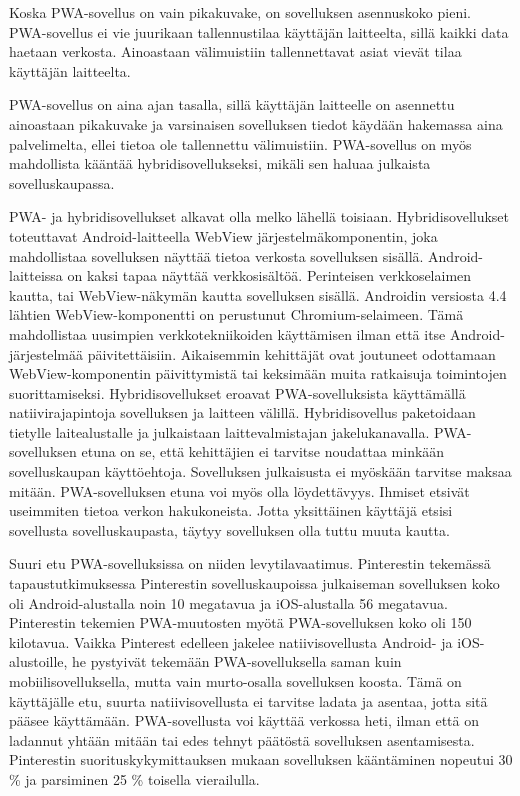 \documentclass{tktltiki}
\begin{document}
Koska PWA-sovellus on vain pikakuvake, on sovelluksen asennuskoko pieni. PWA-sovellus ei vie juurikaan tallennustilaa käyttäjän laitteelta, sillä kaikki data haetaan verkosta. Ainoastaan välimuistiin tallennettavat asiat vievät tilaa käyttäjän laitteelta.

PWA-sovellus on aina ajan tasalla, sillä käyttäjän laitteelle on asennettu ainoastaan pikakuvake ja varsinaisen sovelluksen tiedot käydään hakemassa aina palvelimelta, ellei tietoa ole tallennettu välimuistiin. PWA-sovellus on myös mahdollista kääntää hybridisovellukseksi, mikäli sen haluaa julkaista sovelluskaupassa. 

PWA- ja hybridisovellukset alkavat olla melko lähellä toisiaan. Hybridisovellukset toteuttavat Android-laitteella WebView järjestelmäkomponentin, joka mahdollistaa sovelluksen näyttää tietoa verkosta sovelluksen sisällä. Android-laitteissa on kaksi tapaa näyttää verkkosisältöä. Perinteisen verkkoselaimen kautta, tai WebView-näkymän kautta sovelluksen sisällä. Androidin versiosta 4.4 \cite{chromedeveloper} lähtien WebView-komponentti on perustunut Chromium-selaimeen. Tämä mahdollistaa uusimpien verkkotekniikoiden käyttämisen ilman että itse Android-järjestelmää päivitettäisiin. Aikaisemmin kehittäjät ovat joutuneet odottamaan WebView-komponentin päivittymistä tai keksimään muita ratkaisuja toimintojen suorittamiseksi. Hybridisovellukset eroavat PWA-sovelluksista käyttämällä natiivirajapintoja sovelluksen ja laitteen välillä. Hybridisovellus paketoidaan tietylle laitealustalle ja julkaistaan laittevalmistajan jakelukanavalla. PWA-sovelluksen etuna on se, että kehittäjien ei tarvitse noudattaa minkään sovelluskaupan käyttöehtoja. Sovelluksen julkaisusta ei myöskään tarvitse maksaa mitään. PWA-sovelluksen etuna voi myös olla löydettävyys. Ihmiset etsivät useimmiten tietoa verkon hakukoneista. Jotta yksittäinen käyttäjä etsisi sovellusta sovelluskaupasta, täytyy sovelluksen olla tuttu muuta kautta. 

Suuri etu PWA-sovelluksissa on niiden levytilavaatimus. Pinterestin tekemässä tapaustutkimuksessa \cite{Osmani} Pinterestin sovelluskaupoissa julkaiseman sovelluksen koko oli Android-alustalla noin 10 megatavua ja iOS-alustalla 56 megatavua. Pinterestin tekemien PWA-muutosten myötä PWA-sovelluksen koko oli 150 kilotavua. Vaikka Pinterest edelleen jakelee natiivisovellusta Android- ja iOS-alustoille, he pystyivät tekemään PWA-sovelluksella saman kuin mobiilisovelluksella, mutta vain murto-osalla sovelluksen koosta. Tämä on käyttäjälle etu, suurta natiivisovellusta ei tarvitse ladata ja asentaa, jotta sitä pääsee käyttämään. PWA-sovellusta voi käyttää verkossa heti, ilman että on ladannut yhtään mitään tai edes tehnyt päätöstä sovelluksen asentamisesta. Pinterestin suorituskykymittauksen mukaan \cite{Osmani} sovelluksen kääntäminen nopeutui 30 \% ja parsiminen 25 \% toisella vierailulla.
\end{document}
